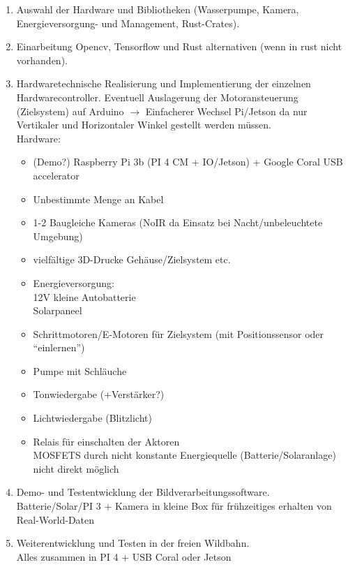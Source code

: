 

\begin{enumerate}
    \item Auswahl der Hardware und Bibliotheken (Wasserpumpe, Kamera, Energieversorgung- und Management, Rust-Crates).
    \item Einarbeitung Opencv, Tensorflow und Rust alternativen (wenn in rust nicht vorhanden).
    \item Hardwaretechnische Realisierung und Implementierung der einzelnen Hardwarecontroller.
            Eventuell Auslagerung der Motoransteuerung (Zielsystem) auf Arduino $\rightarrow$
            Einfacherer Wechsel Pi/Jetson da nur Vertikaler und Horizontaler Winkel
            gestellt werden müssen.\\
            Hardware:
            \begin{itemize}
                \item (Demo?) Raspberry Pi 3b (PI 4 CM + IO/Jetson) + Google Coral USB accelerator
                \item Unbestimmte Menge an Kabel
                \item 1-2 Baugleiche Kameras (NoIR da Einsatz bei Nacht/unbeleuchtete Umgebung)
                \item vielfältige 3D-Drucke Gehäuse/Zielsystem etc.
                \item Energieversorgung:\\
                    12V kleine Autobatterie\\
                    Solarpaneel
                \item Schrittmotoren/E-Motoren für Zielsystem (mit Positionssensor oder "`einlernen"')
                \item Pumpe mit Schläuche
                \item Tonwiedergabe (+Verstärker?)
                \item Lichtwiedergabe (Blitzlicht)
                \item Relais für einschalten der Aktoren
                \\ MOSFETS durch nicht konstante Energiequelle (Batterie/Solaranlage) nicht direkt möglich
            \end{itemize}
    \item Demo- und Testentwicklung der Bildverarbeitungssoftware.
    \\ Batterie/Solar/PI 3 + Kamera in kleine Box für frühzeitiges erhalten von Real-World-Daten
    \item Weiterentwicklung und Testen in der freien Wildbahn.
    \\ Alles zusammen in PI 4 + USB Coral oder Jetson
\end{enumerate}


